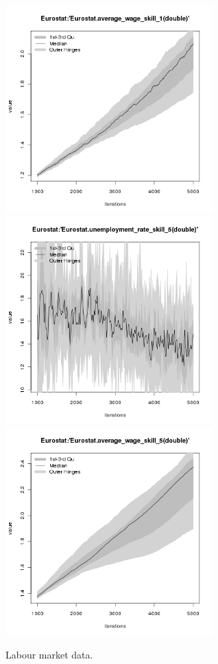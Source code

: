 \begin{figure}[H!]
\begin{minipage}{17cm}
\includegraphics[width=8cm]{./png/tax_0.10/Eurostat-average_wage_skill_1.png}\\
\includegraphics[width=8cm]{./png/tax_0.10/Eurostat-unemployment_rate_skill_5.png}
\includegraphics[width=8cm]{./png/tax_0.10/Eurostat-average_wage_skill_5.png}
\end{minipage}
\caption{Labour market data.}
\label{Figure: Labour Market}
\end{figure}


